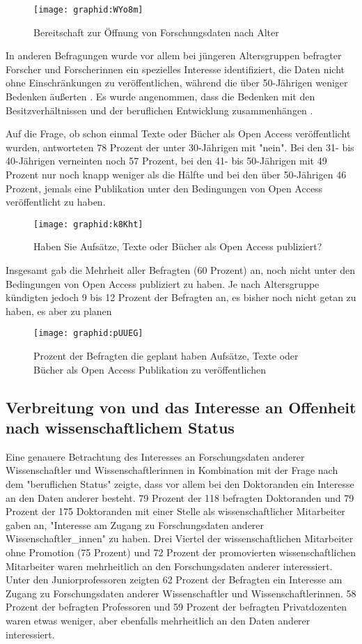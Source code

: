 \begin{figure}[h!]
\texttt{[image: graphid:WYo8m]}
\caption{Bereitschaft zur Öffnung von Forschungsdaten nach Alter}
\end{figure}

In anderen Befragungen wurde vor allem bei jüngeren Altersgruppen befragter Forscher und Forscherinnen ein spezielles Interesse identifiziert, die Daten nicht ohne Einschränkungen zu veröffentlichen, während die über 50-Jährigen weniger Bedenken äußerten \cite{Tenopir_2011}. Es wurde angenommen, dass die Bedenken mit den Besitzverhältnissen und der beruflichen Entwicklung zusammenhängen \cite{Tenopir_2011}.

Auf die Frage, ob schon einmal Texte oder Bücher als Open Access veröffentlicht wurden, antworteten 78 Prozent der unter 30-Jährigen mit "nein". Bei den 31- bis 40-Jährigen verneinten noch 57 Prozent, bei den 41- bis 50-Jährigen mit 49 Prozent nur noch knapp weniger als die Hälfte und bei den über 50-Jährigen 46 Prozent, jemals eine Publikation unter den Bedingungen von Open Access veröffentlicht zu haben.

\begin{figure}[h!]
\texttt{[image: graphid:k8Kht]}
\caption{Haben Sie Aufsätze, Texte oder Bücher als Open Access publiziert?}
\end{figure}

Insgesamt gab die Mehrheit aller Befragten (60 Prozent) an, noch nicht unter den Bedingungen von Open Access publiziert zu haben. Je nach Altersgruppe kündigten jedoch 9 bis 12 Prozent der Befragten an, es bisher noch nicht getan zu haben, es aber zu planen

\begin{figure}[h!]
\texttt{[image: graphid:pUUEG]}
\caption{Prozent der Befragten die geplant haben Aufsätze, Texte oder Bücher als Open Access Publikation zu veröffentlichen}
\end{figure}

\subsection{Verbreitung von und das Interesse an Offenheit nach wissenschaftlichem Status}

Eine genauere Betrachtung des Interesses an Forschungsdaten anderer Wissenschaftler und Wissenschaftlerinnen in Kombination mit der Frage nach dem "beruflichen Status" zeigte, dass vor allem bei den Doktoranden ein Interesse an den Daten anderer besteht. 79 Prozent der 118 befragten Doktoranden und 79 Prozent der 175 Doktoranden mit einer Stelle als wissenschaftlicher Mitarbeiter gaben an, "Interesse am Zugang zu Forschungsdaten anderer Wissenschaftler_innen" zu haben. Drei Viertel der wissenschaftlichen Mitarbeiter ohne Promotion (75 Prozent) und 72 Prozent der promovierten wissenschaftlichen Mitarbeiter waren mehrheitlich an den Forschungsdaten anderer interessiert. Unter den Juniorprofessoren zeigten 62 Prozent der Befragten ein Interesse am Zugang zu Forschungsdaten anderer Wissenschaftler und Wissenschaftlerinnen. 58 Prozent der befragten Professoren und 59 Prozent der befragten Privatdozenten waren etwas weniger, aber ebenfalls mehrheitlich an den Daten anderer interessiert.

